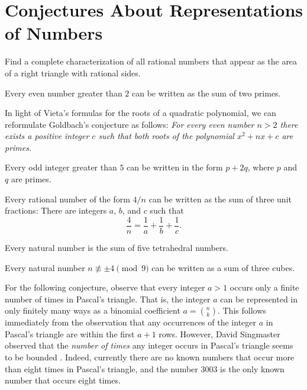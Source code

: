 \section{Conjectures About Representations of Numbers}

\begin{problem}
  Find a complete characterization of all rational numbers that appear as the area of a right triangle with rational sides.
\end{problem}

\begin{conjecture}
  Every even number greater than $2$ can be written as the sum of two primes.
\end{conjecture}

In light of Vieta's formulas for the roots of a quadratic polynomial, we can reformulate Goldbach's conjecture as follows: \emph{For every even number $n>2$ there exists a positive integer $c$ such that both roots of the polynomial $x^2+nx+c$ are primes.}

\begin{conjecture}
  Every odd integer greater than $5$ can be written in the form $p+2q$, where $p$ and $q$ are primes.
\end{conjecture}

\begin{conjecture}
  Every rational number of the form $4/n$ can be written as the sum of three unit fractions: There are integers $a$, $b$, and $c$ such that
  \begin{equation*}
    \frac{4}{n}=\frac{1}{a}+\frac{1}{b}+\frac{1}{c}.
  \end{equation*}
\end{conjecture}

\begin{conjecture}
  Every natural number is the sum of five tetrahedral numbers.
\end{conjecture}

\begin{conjecture}
  Every natural number $n\nequiv \pm 4\pmod{9}$ can be written as a sum of three cubes.
\end{conjecture}

For the following conjecture, observe that every integer $a>1$ occurs only a finite number of times in Pascal's triangle. That is, the integer $a$ can be represented in only finitely many ways as a binomial coefficient $a=\binom{n}{k}$. This follows immediately from the observation that any occurrences of the integer $a$ in Pascal's triangle are within the first $a+1$ rows. However, David Singmaster observed that the \emph{number of times} any integer occurs in Pascal's triangle seems to be bounded \cite{singmaster1971}. Indeed, currently there are no known numbers that occur more than eight times in Pascal's triangle, and the number $3003$ is the only known number that occurs eight times.

